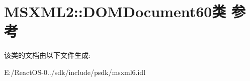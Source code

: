 \hypertarget{class_m_s_x_m_l2_1_1_d_o_m_document60}{}\section{M\+S\+X\+M\+L2\+:\+:D\+O\+M\+Document60类 参考}
\label{class_m_s_x_m_l2_1_1_d_o_m_document60}


该类的文档由以下文件生成\+:\begin{DoxyCompactItemize}
\item 
E\+:/\+React\+O\+S-\/0../sdk/include/psdk/msxml6.\+idl\end{DoxyCompactItemize}
